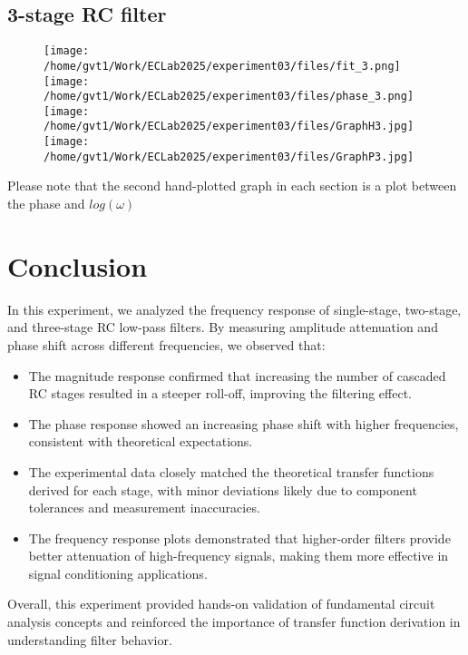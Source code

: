 \documentclass[a4paper,12pt]{article}
\begin{document}
\subsection{3-stage RC filter}
\begin{figure}[H]
\centering
  \texttt{[image: /home/gvt1/Work/ECLab2025/experiment03/files/fit\_3.png]}
  \texttt{[image: /home/gvt1/Work/ECLab2025/experiment03/files/phase\_3.png]}
  \texttt{[image: /home/gvt1/Work/ECLab2025/experiment03/files/GraphH3.jpg]}
  \texttt{[image: /home/gvt1/Work/ECLab2025/experiment03/files/GraphP3.jpg]}
\end{figure}
Please note that the second hand-plotted graph in each section is a plot between the phase and $log(\omega)$
\section{Conclusion}
In this experiment, we analyzed the frequency response of single-stage, two-stage, and three-stage RC low-pass filters. By measuring amplitude attenuation and phase shift across different frequencies, we observed that:  

\begin{itemize}  
    \item The magnitude response confirmed that increasing the number of cascaded RC stages resulted in a steeper roll-off, improving the filtering effect.  
    \item The phase response showed an increasing phase shift with higher frequencies, consistent with theoretical expectations.  
    \item The experimental data closely matched the theoretical transfer functions derived for each stage, with minor deviations likely due to component tolerances and measurement inaccuracies.  
    \item The frequency response plots demonstrated that higher-order filters provide better attenuation of high-frequency signals, making them more effective in signal conditioning applications.  
\end{itemize}  

Overall, this experiment provided hands-on validation of fundamental circuit analysis concepts and reinforced the importance of transfer function derivation in understanding filter behavior.
\end{document}
